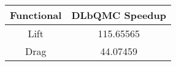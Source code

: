 \begin{tabular}{|c|c|}
\hline
Functional&DLbQMC Speedup\\ 
\hline

Lift & 115.65565\\ 
\hline
Drag & 44.07459\\ 
\hline
\end{tabular}

